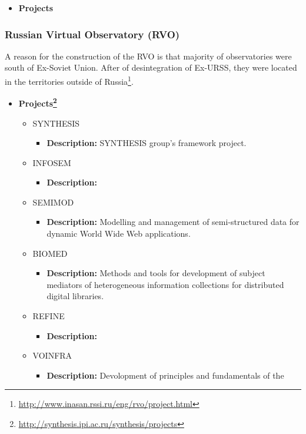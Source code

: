 \begin{itemize}
\item \textbf{Projects}
\end{itemize}

\subsubsection{Russian Virtual Observatory (RVO)}
A reason for the construction of the RVO is that majority of observatories were
south of Ex-Soviet Union. After of desintegration of Ex-URSS, they were located
in the territories outside of
Russia\footnote{\url{http://www.inasan.rssi.ru/eng/rvo/project.html}}.

\begin{itemize}
\item
\textbf{Projects\footnote{\url{http://synthesis.ipi.ac.ru/synthesis/projects}}}
\begin{itemize}
\item SYNTHESIS
\begin{itemize}
\item \textbf{Description:} SYNTHESIS group's framework project.
\end{itemize}
\item INFOSEM
\begin{itemize}
\item \textbf{Description:}
\end{itemize}
\item SEMIMOD
\begin{itemize}
\item \textbf{Description:} Modelling and management of semi-structured data for
dynamic World Wide Web applications.
\end{itemize}
\item BIOMED
\begin{itemize}
\item \textbf{Description:} Methods and tools for development of subject
mediators of he\-te\-ro\-ge\-neous information collections for distributed
digital libraries.
\end{itemize}
\item REFINE
\begin{itemize}
\item \textbf{Description:}
\end{itemize}
\item VOINFRA
\begin{itemize}
\item \textbf{Description:} Devolopment of principles and fundamentals of the

\end{itemize}
\end{itemize}
\end{itemize}
